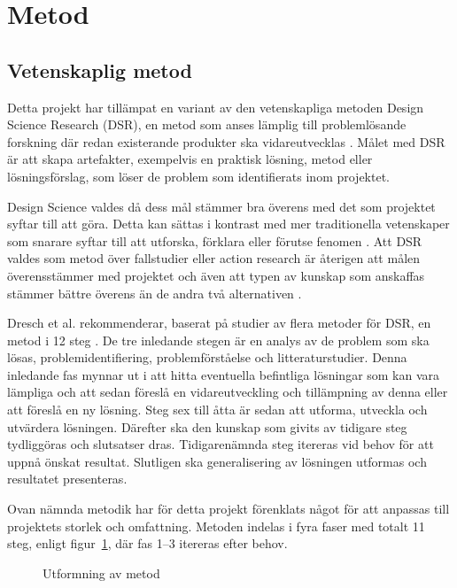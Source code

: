 \section{Metod} %
\label{sec:metod}
    
    \subsection{Vetenskaplig metod} %
    \label{sub:vetenskaplig_metod}
    	Detta projekt har tillämpat en variant av den vetenskapliga metoden Design Science Research (DSR), en metod som anses lämplig till problemlösande forskning där redan existerande produkter ska vidareutvecklas \cite[s.~13]{dsr}. Målet med DSR är att skapa artefakter, exempelvis en praktisk lösning, metod eller lösningsförslag, som löser de problem som identifierats inom projektet. \bigskip

        Design Science valdes då dess mål stämmer bra överens med det som projektet syftar till att göra. Detta kan sättas i kontrast med mer traditionella vetenskaper som snarare syftar till att utforska, förklara eller förutse fenomen \cite[s.~13]{dsr}. Att DSR valdes som metod över fallstudier eller action research är återigen att målen överensstämmer med projektet och även att typen av kunskap som anskaffas stämmer bättre överens än de andra två alternativen \cite[s.~95]{dsr}.\bigskip

    	Dresch et al. rekommenderar, baserat på studier av flera metoder för DSR, en metod i 12 steg \cite[s.~118--126]{dsr}. De tre inledande stegen är en analys av de problem som ska lösas, problemidentifiering, problemförståelse och litteraturstudier. Denna inledande fas mynnar ut i att hitta eventuella befintliga lösningar som kan vara lämpliga och att sedan föreslå en vidareutveckling och tillämpning av denna eller att föreslå en ny lösning. Steg sex till åtta är sedan att utforma, utveckla och utvärdera lösningen. Därefter ska den kunskap som givits av tidigare steg tydliggöras och slutsatser dras. Tidigarenämnda steg itereras vid behov för att uppnå önskat resultat. Slutligen ska generalisering av lösningen utformas och resultatet presenteras. \bigskip

    	Ovan nämnda metodik har för detta projekt förenklats något för att anpassas till projektets storlek och omfattning. Metoden indelas i fyra faser med totalt 11 steg, enligt figur~\ref{fig:method}, där fas 1--3 itereras efter behov.

        \begin{figure}[b]
            \centering
            
            \caption{\label{fig:method} Utformning av metod}
        \end{figure}

